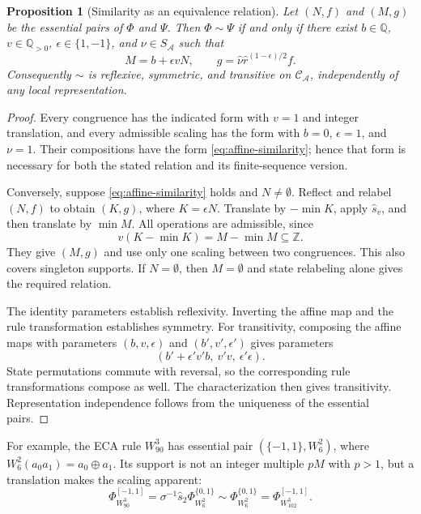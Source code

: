 \documentclass[11pt,a4paper]{article}
\newenvironment{revision}{\color{blue}}{}
\newenvironment{revision}{\color{black}}{}
\newcommand{\locmark}[1]{\label{#1}\linelabel{line:#1}}
\newtheorem{prop}{Proposition}
\begin{document}
\begin{revision}
\begin{prop}[Similarity as an equivalence relation]
\label{prop:similarity}\locmark{loc:similarity}
Let $(N,f)$ and $(M,g)$ be the essential pairs of $\Phi$ and $\Psi$.
Then $\Phi\sim\Psi$ if and only if there exist
$b\in\mathbb Q$, $v\in\mathbb Q_{>0}$,
$\epsilon\in\{1,-1\}$, and $\nu\in S_{\mathcal A}$ such that
\begin{equation}\label{eq:affine-similarity}
M=b+\epsilon vN,\qquad
g=\hat\nu\hat r^{(1-\epsilon)/2}f.
\end{equation}
Consequently $\sim$ is reflexive, symmetric, and transitive on
$\mathcal C_{\mathcal A}$, independently of any local representation.
\end{prop}
\begin{proof}
Every congruence has the indicated form with $v=1$ and integer
translation, and every admissible scaling has the form with $b=0$,
$\epsilon=1$, and $\nu=1$.
Their compositions have the form \eqref{eq:affine-similarity}; hence that
form is necessary for both the stated relation and its finite-sequence
version.

Conversely, suppose \eqref{eq:affine-similarity} holds and $N\ne\emptyset$.
Reflect and relabel $(N,f)$ to obtain $(K,g)$, where $K=\epsilon N$.
Translate by $-\min K$, apply $\hat s_v$, and then translate by $\min M$.
All operations are admissible, since
\[
v(K-\min K)=M-\min M\subseteq\mathbb Z.
\]
They give $(M,g)$ and use only one scaling between two congruences.
This also covers singleton supports. If $N=\emptyset$, then $M=\emptyset$
and state relabeling alone gives the required relation.

The identity parameters establish reflexivity. Inverting the affine map
and the rule transformation establishes symmetry. For transitivity,
composing the affine maps with parameters $(b,v,\epsilon)$ and
$(b',v',\epsilon')$ gives parameters
\[
(b'+\epsilon'v'b,\ v'v,\ \epsilon'\epsilon).
\]
State permutations commute with reversal, so the corresponding rule
transformations compose as well. The characterization then gives
transitivity. Representation independence follows from the uniqueness
of the essential pairs.
\end{proof}

For example, the ECA rule $W^3_{90}$ has essential pair
$(\{-1,1\},W^2_6)$, where $W^2_6(a_0a_1)=a_0\oplus a_1$.
Its support is not an integer multiple $pM$ with $p>1$, but a translation
makes the scaling apparent:
\[
\Phi^{[-1,1]}_{W^3_{90}}
=\sigma^{-1}\hat s_2\Phi^{\{0,1\}}_{W^2_6}
\sim\Phi^{\{0,1\}}_{W^2_6}
=\Phi^{[-1,1]}_{W^3_{102}}.
\]


\end{revision}
\end{document}
